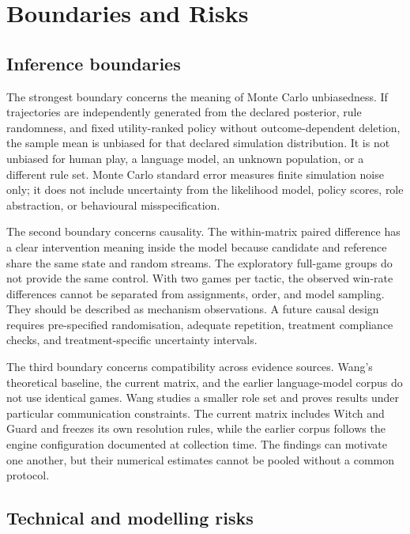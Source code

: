\documentclass[11pt,a4paper]{article}
\begin{document}
\section{Boundaries and Risks}

\subsection{Inference boundaries}

The strongest boundary concerns the meaning of Monte Carlo unbiasedness. If trajectories are independently generated from the declared posterior, rule randomness, and fixed utility-ranked policy without outcome-dependent deletion, the sample mean is unbiased for that declared simulation distribution. It is not unbiased for human play, a language model, an unknown population, or a different rule set. Monte Carlo standard error measures finite simulation noise only; it does not include uncertainty from the likelihood model, policy scores, role abstraction, or behavioural misspecification.

The second boundary concerns causality. The within-matrix paired difference has a clear intervention meaning inside the model because candidate and reference share the same state and random streams. The exploratory full-game groups do not provide the same control. With two games per tactic, the observed win-rate differences cannot be separated from assignments, order, and model sampling. They should be described as mechanism observations. A future causal design requires pre-specified randomisation, adequate repetition, treatment compliance checks, and treatment-specific uncertainty intervals.

The third boundary concerns compatibility across evidence sources. Wang's theoretical baseline, the current matrix, and the earlier language-model corpus do not use identical games. Wang studies a smaller role set and proves results under particular communication constraints. The current matrix includes Witch and Guard and freezes its own resolution rules, while the earlier corpus follows the engine configuration documented at collection time. The findings can motivate one another, but their numerical estimates cannot be pooled without a common protocol.

\subsection{Technical and modelling risks}
\end{document}
